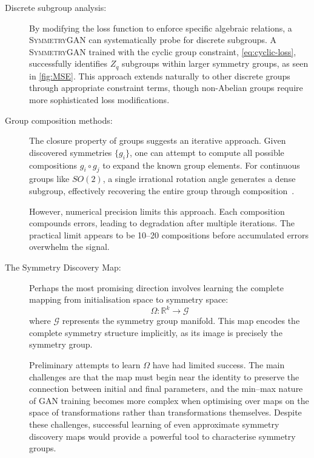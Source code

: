             \begin{description}
                \item[Discrete subgroup analysis:] By modifying the loss function to enforce specific algebraic relations, a \textsc{SymmetryGAN} can systematically probe for discrete subgroups.
                A \textsc{SymmetryGAN} trained with the cyclic group constraint, \cref{eq:cyclic-loss}, successfully identifies \(Z_q\) subgroups within larger symmetry groups, as seen in \cref{fig:MSE}.
                This approach extends naturally to other discrete groups through appropriate constraint terms, though non-Abelian groups require more sophisticated loss modifications.
                \item[{Group composition methods}:] The closure property of groups suggests an iterative approach. Given discovered symmetries \(\{g_i\}\), one can attempt to compute all possible compositions \(g_i \circ g_j\) to expand the known group elements.
                For continuous groups like \(SO(2)\), a single irrational rotation angle generates a dense subgroup, effectively recovering the entire group through composition~\cite{hall_matrix_2015}.
                
                However, numerical precision limits this approach.
                Each composition compounds errors, leading to degradation after multiple iterations.
                The practical limit appears to be \numrange{10}{20} compositions before accumulated errors overwhelm the signal.
                \item[The Symmetry Discovery Map:] Perhaps the most promising direction involves learning the complete mapping from initialisation space to symmetry space:
                \[
                    \Omega: \mathbb{R}^k \rightarrow \mathcal{G}
                \]
                where \(\mathcal{G}\) represents the symmetry group manifold.
                This map encodes the complete symmetry structure implicitly, as its image is precisely the symmetry group.
                
                Preliminary attempts to learn \(\Omega\) have had limited success.
                The main challenges are that the map must begin near the identity to preserve the connection between initial and final parameters, and the min--max nature of GAN training becomes more complex when optimising over maps on the space of transformations rather than transformations themselves.
                Despite these challenges, successful learning of even approximate symmetry discovery maps would provide a powerful tool to characterise symmetry groups.
            \end{description}

